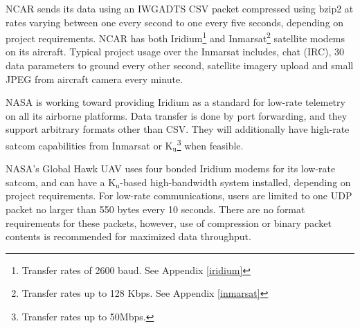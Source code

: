 NCAR sends its data using an IWGADTS CSV packet compressed using bzip2 at rates varying between one every second to one every five seconds, depending on project requirements.  NCAR has both Iridium\footnote{Transfer rates of 2600 baud. See Appendix \ref{iridium}} and Inmarsat\footnote{Transfer rates up to 128 Kbps.  See Appendix \ref{inmarsat}} satellite modems on its aircraft.  Typical project usage over the Inmarsat includes, chat (IRC), 30 data parameters to ground every other second, satellite imagery upload and small JPEG from aircraft camera every minute.  

NASA is working toward providing Iridium as a standard for low-rate telemetry on all its airborne platforms.  Data transfer is done by port forwarding, and they support arbitrary formats other than CSV.  They will additionally have high-rate satcom capabilities from Inmarsat or K$_{\textrm{u}}$\footnote{Transfer rates up to 50Mbps.}  when feasible.  

NASA's Global Hawk UAV uses four bonded Iridium modems for its low-rate satcom, and can have a K$_{\textrm{u}}$-based high-bandwidth system  installed, depending on project requirements.  For low-rate communications, users are limited to one UDP packet no larger than 550 bytes every 10 seconds.  There are no format requirements for these packets, however, use of compression or binary packet contents is recommended for maximized data throughput.  



 







